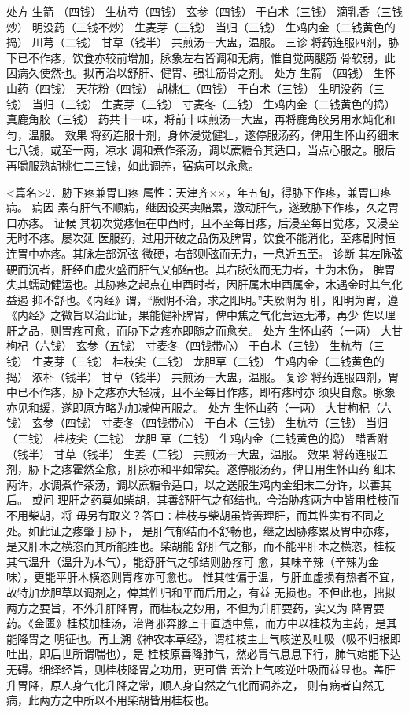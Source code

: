 \documentclass[a4paper,12pt,UTF8,twoside]{ctexbook}
\begin{document}
处方 生箭 （四钱） 生杭芍（四钱） 玄参（四钱） 于白术（三钱） 
滴乳香（三钱炒） 明没药（三钱不炒） 生麦芽（三钱） 当归（三钱） 
生鸡内金（二钱黄色的捣） 川芎（二钱） 甘草（钱半） 
共煎汤一大盅，温服。 
三诊 将药连服四剂，胁下已不作疼，饮食亦较前增加，脉象左右皆调和无病，惟自觉两腿筋 
骨软弱，此因病久使然也。拟再治以舒肝、健胃、强壮筋骨之剂。 
处方 生箭 （四钱） 生怀山药（四钱） 天花粉（四钱） 胡桃仁（四钱） 
于白术（三钱） 生明没药（三钱） 当归（三钱） 生麦芽（三钱） 
寸麦冬（三钱） 生鸡内金（二钱黄色的捣） 真鹿角胶（三钱） 
药共十一味，将前十味煎汤一大盅，再将鹿角胶另用水炖化和匀，温服。 
效果 将药连服十剂，身体浸觉健壮，遂停服汤药，俾用生怀山药细末七八钱，或至一两，凉水 
调和煮作茶汤，调以蔗糖令其适口，当点心服之。服后再嚼服熟胡桃仁二三钱，如此调养，宿病可以永愈。 


<篇名>2．胁下疼兼胃口疼
属性：天津齐××，年五旬，得胁下作疼，兼胃口疼病。 
病因 素有肝气不顺病，继因设买卖赔累，激动肝气，遂致胁下作疼，久之胃口亦疼。 
证候 其初次觉疼恒在申酉时，且不至每日疼，后浸至每日觉疼，又浸至无时不疼。屡次延 
医服药，过用开破之品伤及脾胃，饮食不能消化，至疼剧时恒连胃中亦疼。其脉左部沉弦 
微硬，右部则弦而无力，一息近五至。 
诊断 其左脉弦硬而沉者，肝经血虚火盛而肝气又郁结也。其右脉弦而无力者，土为木伤， 
脾胃失其蠕动健运也。其胁疼之起点在申酉时者，因肝属木申酉属金，木遇金时其气化益遏 
抑不舒也。《内经》谓，“厥阴不治，求之阳明。”夫厥阴为 
肝，阳明为胃，遵《内经》之微旨以治此证，果能健补脾胃，俾中焦之气化营运无滞，再少 
佐以理肝之品，则胃疼可愈，而胁下之疼亦即随之而愈矣。 
处方 生怀山药（一两） 大甘枸杞（六钱） 玄参（五钱） 寸麦冬（四钱带心） 
于白术（三钱） 生杭芍（三钱） 生麦芽（三钱） 桂枝尖（二钱） 
龙胆草（二钱） 生鸡内金（二钱黄色的捣） 浓朴（钱半） 甘草（钱半） 
共煎汤一大盅，温服。 
复诊 将药连服四剂，胃中已不作疼，胁下之疼亦大轻减，且不至每日作疼，即有疼时亦 
须臾自愈。脉象亦见和缓，遂即原方略为加减俾再服之。 
处方 生怀山药（一两） 大甘枸杞（六钱） 玄参（四钱） 寸麦冬（四钱带心） 
于白术（三钱） 生杭芍（三钱） 当归（三钱） 桂枝尖（二钱） 龙胆 
草（二钱） 生鸡内金（二钱黄色的捣） 醋香附（钱半） 甘草（钱半） 生姜（二钱） 
共煎汤一大盅，温服。 
效果 将药连服五剂，胁下之疼霍然全愈，肝脉亦和平如常矣。遂停服汤药，俾日用生怀山药 
细末两许，水调煮作茶汤，调以蔗糖令适口，以之送服生鸡内金细末二分许，以善其后。 
或问 理肝之药莫如柴胡，其善舒肝气之郁结也。今治胁疼两方中皆用桂枝而不用柴胡，将 
毋另有取义？答曰∶桂枝与柴胡虽皆善理肝，而其性实有不同之处。如此证之疼肇于胁下， 
是肝气郁结而不舒畅也，继之因胁疼累及胃中亦疼，是又肝木之横恣而其所能胜也。柴胡能 
舒肝气之郁，而不能平肝木之横恣，桂枝其气温升（温升为木气），能舒肝气之郁结则胁疼可 
愈，其味辛辣（辛辣为金味），更能平肝木横恣则胃疼亦可愈也。 
惟其性偏于温，与肝血虚损有热者不宜，故特加龙胆草以调剂之，俾其性归和平而后用之，有益 
无损也。不但此也，拙拟两方之要旨，不外升肝降胃，而桂枝之妙用，不但为升肝要药，实又为 
降胃要药。《金匮》桂枝加桂汤，治肾邪奔豚上干直透中焦，而方中以桂枝为主药，是其能降胃之 
明征也。再上溯《神农本草经》，谓桂枝主上气咳逆及吐吸（吸不归根即吐出，即后世所谓喘也），是 
桂枝原善降肺气，然必胃气息息下行，肺气始能下达无碍。细绎经旨，则桂枝降胃之功用，更可借 
善治上气咳逆吐吸而益显也。盖肝升胃降，原人身气化升降之常，顺人身自然之气化而调养之， 
则有病者自然无病，此两方之中所以不用柴胡皆用桂枝也。 
\end{document}
